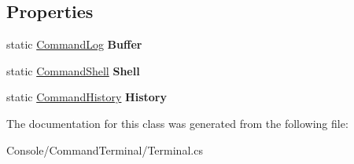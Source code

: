 \subsection*{Properties}
\begin{DoxyCompactItemize}
\item 
\mbox{\label{class_command_terminal_1_1_terminal_ac767b28d5c7b0e40483af24df404608c}} 
static \mbox{\hyperlink{class_command_terminal_1_1_command_log}{Command\+Log}} {\bfseries Buffer}
\item 
\mbox{\label{class_command_terminal_1_1_terminal_a8657690c56e66494c9e84c67272eafa5}} 
static \mbox{\hyperlink{class_command_terminal_1_1_command_shell}{Command\+Shell}} {\bfseries Shell}
\item 
\mbox{\label{class_command_terminal_1_1_terminal_a45a376c35f548d7498be0cbfe395df72}} 
static \mbox{\hyperlink{class_command_terminal_1_1_command_history}{Command\+History}} {\bfseries History}
\end{DoxyCompactItemize}


The documentation for this class was generated from the following file\+:\begin{DoxyCompactItemize}
\item 
Console/\+Command\+Terminal/Terminal.\+cs\end{DoxyCompactItemize}
